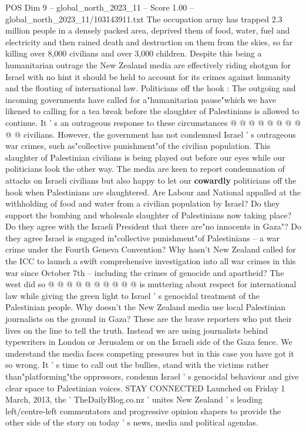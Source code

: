 \begin{textsample}{POS Dim 9 – global\_north\_2023\_11 – Score 1.00 – global\_north\_2023\_11/103143911.txt}
The occupation army has trapped 2.3 million people in a densely packed area, deprived them of food, water, fuel and electricity and then rained death and destruction on them from the skies, so far killing over 8,000 civilians and over 3,000 children.
Despite this being a humanitarian outrage the New Zealand media are effectively riding shotgun for Israel with no hint it should be held to account for its crimes against humanity and the flouting of international law.
Politicians off the hook : The outgoing and incoming governments have called for a"humanitarian pause"which we have likened to calling for a tea break before the slaughter of Palestinians is allowed to continue.
It ' s an outrageous response to these circumstances @ @ @ @ @ @ @ @ @ @ civilians.
However, the government has not condemned Israel ' s outrageous war crimes, such as"collective punishment"of the civilian population.
This slaughter of Palestinian civilians is being played out before our eyes while our politicians look the other way.
The media are keen to report condemnation of attacks on Israeli civilians but also happy to let our \textbf{cowardly} politicians off the hook when Palestinians are slaughtered.
Are Labour and National appalled at the withholding of food and water from a civilian population by Israel?
Do they support the bombing and wholesale slaughter of Palestinians now taking place?
Do they agree with the Israeli President that there are"no innocents in Gaza"?
Do they agree Israel is engaged in"collective punishment"of Palestinians -- a war crime under the Fourth Geneva Convention?
Why hasn't New Zealand called for the ICC to launch a swift comprehensive investigation into all war crimes in this war since October 7th -- including the crimes of genocide and apartheid?
The west did so @ @ @ @ @ @ @ @ @ @ is muttering about respect for international law while giving the green light to Israel ' s genocidal treatment of the Palestinian people.
Why doesn't the New Zealand media use local Palestinian journalists on the ground in Gaza?
These are the brave reporters who put their lives on the line to tell the truth.
Instead we are using journalists behind typewriters in London or Jerusalem or on the Israeli side of the Gaza fence.
We understand the media faces competing pressures but in this case you have got it so wrong.
It ' s time to call out the bullies, stand with the victims rather than"platforming"the oppressors, condemn Israel ' s genocidal behaviour and give clear space to Palestinian voices.
STAY CONNECTED Launched on Friday 1 March, 2013, the ' TheDailyBlog.co.nz ' unites New Zealand ' s leading left/centre-left commentators and progressive opinion shapers to provide the other side of the story on today ' s news, media and political agendas.

\end{textsample}
